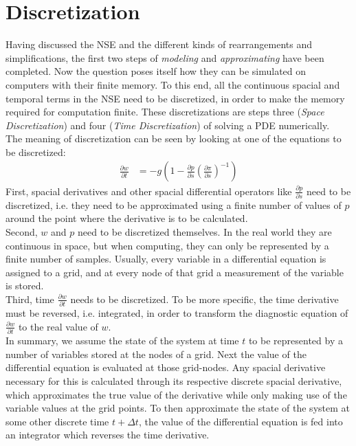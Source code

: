 \chapter{Discretization}\label{chapter:discretization}
Having discussed the NSE and the different kinds of rearrangements and simplifications, the first two steps of \emph{modeling} and \emph{approximating} have been completed.
Now the question poses itself how they can be simulated on computers with their finite memory.
To this end, all the continuous spacial and temporal terms in the NSE need to be discretized, in order to make the memory required for computation finite.
These discretizations are steps three (\emph{Space Discretization}) and four (\emph{Time Discretization}) of solving a PDE numerically.\\
The meaning of discretization can be seen by looking at one of the equations to be discretized:
\begin{align*}
\frac{\partial w}{\partial t} &= -g\left(1 - \frac{\partial p}{\partial s}\left(\frac{\partial \pi}{\partial s}\right)^{-1}\right)
\end{align*}
First, spacial derivatives and other spacial differential operators like $\frac{\partial p}{\partial s}$ need to be discretized, i.e. they need to be approximated using a finite number of values of $p$ around the point where the derivative is to be calculated.\\
Second, $w$ and $p$ need to be discretized themselves.
In the real world they are continuous in space, but when computing, they can only be represented by a finite number of samples.
Usually, every variable in a differential equation is assigned to a grid, and at every node of that grid a measurement of the variable is stored.\\
Third, time $\frac{\partial w}{\partial t}$ needs to be discretized.
To be more specific, the time derivative must be reversed, i.e. integrated, in order to transform the diagnostic equation of $\frac{\partial w}{\partial t}$ to the real value of $w$.\\
In summary, we assume the state of the system at time $t$ to be represented by a number of variables stored at the nodes of a grid.
Next the value of the differential equation is evaluated at those grid-nodes.
Any spacial derivative necessary for this is calculated through its respective discrete spacial derivative, which approximates the true value of the derivative while only making use of the variable values at the grid points.
To then approximate the state of the system at some other discrete time $t+\Delta t$, the value of the differential equation is fed into an integrator which reverses the time derivative.


